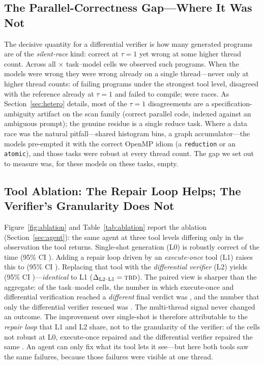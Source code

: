 \subsection{The Parallel-Correctness Gap---Where It Was Not}
The decisive quantity for a differential verifier is how many generated programs
are of the \emph{silent-race} kind: correct at $\tau{=}1$ yet wrong at some higher
thread count. Across all \Ntasks{}$\times$\Nmodels{} task--model cells we observed
\NfailRace{} such programs. When the models were wrong they were wrong already on a
single thread---never only at higher thread counts: of \Nfail{} failing programs
under the strongest tool level, \NfailSemantic{} disagreed with the reference
already at $\tau{=}1$ and \NfailCompile{} failed to compile; \NfailRace{} were
races. As Section~\ref{sec:hetero} details, most of the $\tau{=}1$ disagreements are
a specification-ambiguity artifact on the scan family (correct parallel code, indexed
against an ambiguous prompt); the genuine residue is a single reduce task.
Where a data race was the natural pitfall---shared
histogram bins, a graph accumulator---the models pre-empted it with the correct
OpenMP idiom (a \texttt{reduction} or an \texttt{atomic}), and those tasks were
robust at every thread count. The gap we set out to measure was, for these models
on these tasks, empty.

\subsection{Tool Ablation: The Repair Loop Helps; The Verifier's Granularity Does Not}
\label{sec:ablation}
Figure~\ref{fig:ablation} and Table~\ref{tab:ablation} report the ablation
(Section~\ref{sec:agent}): the same agent at three tool levels differing only in
the observation the tool returns. Single-shot generation (L0) is robustly correct
\Lzerorate{} of the time (95\% CI \Lzeroci{}). Adding a repair loop driven by an
\emph{execute-once} tool (L1) raises this to \Lonerate{} (95\% CI \Loneci{}).
Replacing that tool with the \emph{differential verifier} (L2) yields \Ltworate{}
(95\% CI \Ltwoci{})---\emph{identical} to L1
($\Delta_{\text{L2--L1}}=\textsc{tbd}{}$). The paired view is sharper than the
aggregate: of the \Npairs{} task--model cells, the number in which execute-once and
differential verification reached a \emph{different} final verdict was \Ndiffer{},
and the number that only the differential verifier rescued was \DvOnlyRescued{}.
The multi-thread signal never changed an outcome. The improvement over single-shot
is therefore attributable to the \emph{repair loop} that L1 and L2 share, not to
the granularity of the verifier: of the \NfailSingleShot{} cells not robust at L0,
execute-once repaired \EoRescued{} and the differential verifier repaired the same
\DvRescued{}. An agent can only fix what its tool lets it
see---but here both tools saw the same failures, because those failures were
visible at one thread.

